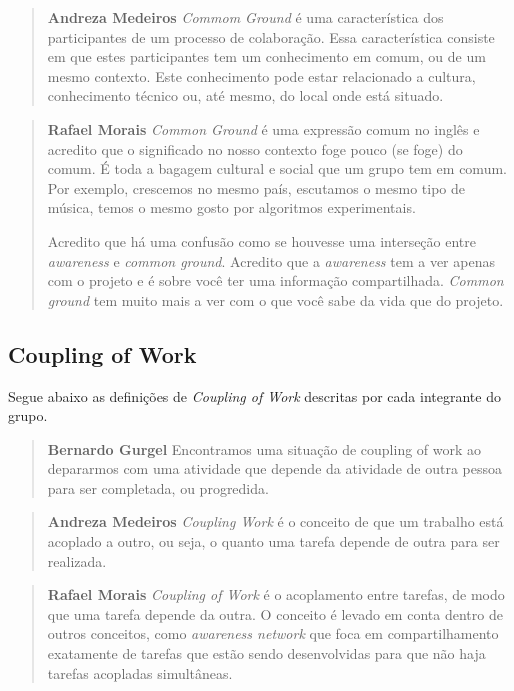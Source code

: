 \documentclass{acm_proc_article-sp}
\begin{document}
\begin{quote}\textbf{Andreza Medeiros}
\textsl{Commom Ground} é uma característica dos participantes de um processo de colaboração\cite{Olson:DM}. Essa característica consiste em que estes participantes tem um conhecimento em comum, ou de um mesmo contexto. Este conhecimento pode estar relacionado a cultura, conhecimento técnico ou, até mesmo, do local onde está situado. 
\end{quote}

\begin{quote}\textbf{Rafael Morais}
  \textsl{Common Ground} é uma expressão comum no inglês e acredito que o significado no nosso contexto foge pouco (se foge) do comum.
  É toda a bagagem cultural e social que um grupo tem em comum.
  Por exemplo, crescemos no mesmo país, escutamos o mesmo tipo de música, temos o mesmo gosto por algoritmos experimentais.

  Acredito que há uma confusão como se houvesse uma interseção entre \textsl{awareness} e \textsl{common ground}. Acredito que a
  \textsl{awareness} tem a ver apenas com o projeto e é sobre você ter uma informação compartilhada. \textsl{Common ground} tem muito
  mais a ver com o que você sabe da vida que do projeto.
\end{quote}

\subsection{Coupling of Work}
Segue abaixo as definições de \textsl{Coupling of Work} descritas por cada integrante do grupo.

\begin{quote}\textbf{Bernardo Gurgel}
Encontramos uma situação de coupling of work ao depararmos com uma atividade que depende da atividade de outra pessoa para ser completada, ou progredida.
\end{quote}

\begin{quote}\textbf{Andreza Medeiros}
\textsl{Coupling Work} é o conceito de que um trabalho está acoplado a outro, ou seja, o quanto uma tarefa depende de outra para ser realizada. 
\end{quote}

\begin{quote}\textbf{Rafael Morais}
  \textsl{Coupling of Work} é o acoplamento entre tarefas, de modo que uma tarefa depende da outra. O conceito é levado em conta dentro de outros
  conceitos, como \textsl{awareness network} que foca em compartilhamento exatamente de tarefas que estão sendo desenvolvidas para que não haja
  tarefas acopladas simultâneas.
\end{quote}
\end{document}
